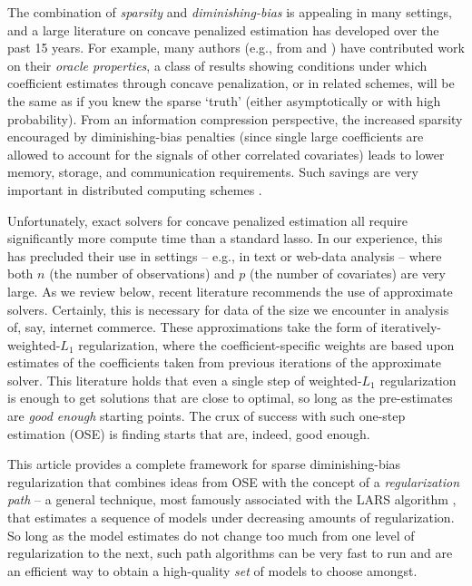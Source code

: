 \documentclass[twoside]{article}
\begin{document}
The combination of  \textit{sparsity} and \textit{diminishing-bias} 
 is appealing in many settings, and a large literature on concave
penalized estimation has developed over the past 15 years.  For example, many
authors (e.g., from \citealt{fan_variable_2001} and
\citealt{fan_nonconcave_2004})  have contributed work on their \textit{oracle
properties}, a class of results showing conditions under which coefficient
estimates through concave penalization, or in related schemes, will be the
same as if you knew the sparse `truth' (either asymptotically or with high
probability).   From an information compression perspective,  the increased
sparsity encouraged by diminishing-bias penalties (since single large
coefficients are allowed to account for the signals of other correlated
covariates) leads to lower memory, storage, and communication requirements.
Such savings are very important in distributed  computing schemes
\citep[e.g.,][]{taddy_distributed_2013}.



Unfortunately,  exact solvers for concave penalized estimation  all require
significantly more compute time than a standard lasso.  In our experience,
this has precluded their use in settings -- e.g., in text or web-data analysis
-- where both $n$ (the number of observations) and $p$ (the number of
   covariates) are very large. As we review below,  recent literature
   recommends the use of approximate solvers. Certainly, this is necessary for
   data of the size we encounter in analysis of, say, internet commerce.
   These approximations  take the form of iteratively-weighted-$L_1$
   regularization, where the coefficient-specific weights are based upon
   estimates of the coefficients taken from previous iterations of the
   approximate solver.  This literature
\citep[e.g.,][]{zou_one-step_2008,fan_strong_2014} 
holds that even a single step of weighted-$L_1$ regularization is enough to
get solutions that are close to optimal, so long as the pre-estimates are
\textit{good enough} starting points. The crux of success with such one-step
estimation (OSE) is  finding starts that are, indeed, good enough.


This article provides a complete framework for sparse diminishing-bias
regularization that combines ideas from OSE with the concept of a
\textit{regularization path} -- a general technique, most famously associated
with the LARS algorithm \cite{efron_least_2004}, that estimates a sequence of
models under decreasing amounts of regularization.  So long as the model estimates do not change too much from one level of regularization to the next, such path algorithms can be very fast to run and are an efficient way to obtain a high-quality \textit{set} of models to choose amongst.  
\end{document}
